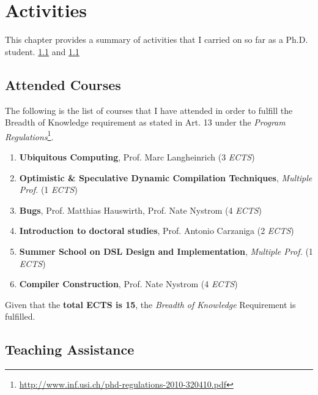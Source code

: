
\newenvironment{courses}{\begin{enumerate}}{\end{enumerate}}

\newcommand{\course}[4]{\item[\textit{#1}] \textbf{#2}, #3 (#4 \emph{ECTS})}

\newenvironment{tas}{\begin{enumerate}}{\end{enumerate}}

\newcommand{\ta}[6]{
\item[\textit{#1}] \textbf{#2}, Prof. #3 (#4 \emph{ECTS}, #5) \\
{\footnotesize \url{#6}}
}

\chapter{\phd{} Activities}

\label{ch:phd-timeline}

This chapter provides a summary of activities that I carried on so far as a Ph.D. student.
\cref{sec:ects} and \cref{sec:ects}

\section{Attended Courses} \label{sec:ects}

The following is the list of courses that I have attended in order to fulfill the Breadth of Knowledge requirement as stated in Art. 13 under the \emph{\phd{} Program Regulations}\footnote{\url{http://www.inf.usi.ch/phd-regulations-2010-320410.pdf}}.

\begin{courses}
\course{Fall '13}{Ubiquitous Computing}{Prof. Marc Langheinrich}{3}
\course{Fall '13}{Optimistic \& Speculative Dynamic Compilation Techniques}{\emph{Multiple Prof.}}{1}
\course{Spring '14}{Bugs}{Prof. Matthias Hauswirth, Prof. Nate Nystrom}{4}
\course{Spring '14}{Introduction to doctoral studies}{Prof. Antonio Carzaniga}{2}
\course{Spring '15}{Summer School on DSL Design and Implementation}{\emph{Multiple Prof.}}{1}
\course{Spring '17}{Compiler Construction}{Prof. Nate Nystrom}{4}
\end{courses}

Given that the \textbf{total ECTS is 15}, the \emph{Breadth of Knowledge} Requirement is fulfilled.


\section{Teaching Assistance}

